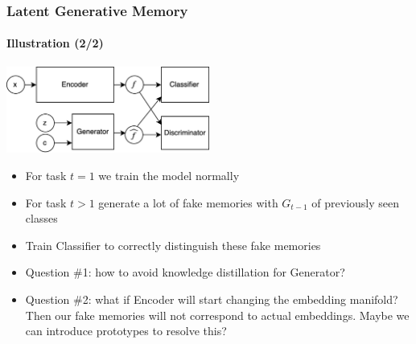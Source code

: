 \documentclass[10pt]{beamer}
\begin{document}
\begin{frame}
    \frametitle{Latent Generative Memory}
    \framesubtitle{Illustration (2/2)}

    \centering
    \includegraphics[width=0.5\textwidth]{images/latent-genmem}
    
    \begin{itemize}
        \item For task $t=1$ we train the model normally
        \item For task $t > 1$ generate a lot of fake memories with $G_{t-1}$ of previously seen classes
        \item Train Classifier to correctly distinguish these fake memories
        \item Question \#1: how to avoid knowledge distillation for Generator?
        \item Question \#2: what if Encoder will start changing the embedding manifold? Then our fake memories will not correspond to actual embeddings. Maybe we can introduce prototypes to resolve this?
    \end{itemize}
\end{frame}

%    
\end{document}
